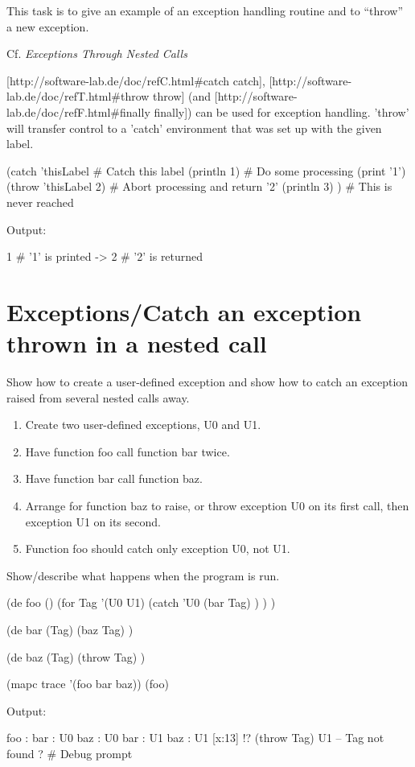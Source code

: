 This task is to give an example of an exception handling routine and to
``throw'' a new exception.

Cf. \emph{Exceptions Through Nested Calls}


\begin{wideverbatim}

  [http://software-lab.de/doc/refC.html#catch catch],
  [http://software-lab.de/doc/refT.html#throw throw] (and
  [http://software-lab.de/doc/refF.html#finally finally]) can be used
  for exception handling. 'throw' will transfer control to a 'catch'
  environment that was set up with the given label.

(catch 'thisLabel          # Catch this label
   (println 1)             # Do some processing (print '1')
   (throw 'thisLabel 2)    # Abort processing and return '2'
   (println 3) )           # This is never reached

Output:

1        # '1' is printed
-> 2     # '2' is returned

\end{wideverbatim}

\pagebreak{}
\section*{Exceptions/Catch an exception thrown in a nested call}

Show how to create a user-defined exception and show how to catch an
exception raised from several nested calls away.

\begin{enumerate}
\item
  Create two user-defined exceptions, U0 and U1.
\item
  Have function foo call function bar twice.
\item
  Have function bar call function baz.
\item
  Arrange for function baz to raise, or throw exception U0 on its first
  call, then exception U1 on its second.
\item
  Function foo should catch only exception U0, not U1.
\end{enumerate}

Show/describe what happens when the program is run.


\begin{wideverbatim}

(de foo ()
   (for Tag '(U0 U1)
      (catch 'U0
         (bar Tag) ) ) )

(de bar (Tag)
   (baz Tag) )

(de baz (Tag)
   (throw Tag) )

(mapc trace '(foo bar baz))
(foo)

Output:

 foo :
  bar : U0
   baz : U0
  bar : U1
   baz : U1
[x:13] !? (throw Tag)
U1 -- Tag not found
?                          # Debug prompt

\end{wideverbatim}

